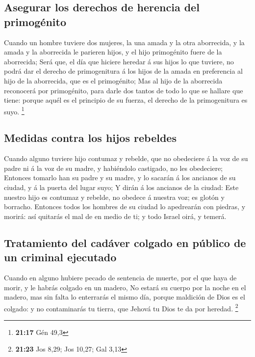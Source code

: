 \hypertarget{asegurar-los-derechos-de-herencia-del-primoguxe9nito}{%
\subsection{Asegurar los derechos de herencia del
primogénito}\label{asegurar-los-derechos-de-herencia-del-primoguxe9nito}}

 Cuando un hombre tuviere dos mujeres, la una amada y la
otra aborrecida, y la amada y la aborrecida le parieren hijos, y el hijo
primogénito fuere de la aborrecida;  Será que, el día que
hiciere heredar á sus hijos lo que tuviere, no podrá dar el derecho de
primogenitura á los hijos de la amada en preferencia al hijo de la
aborrecida, que es el primogénito;  Mas al hijo de la
aborrecida reconocerá por primogénito, para darle dos tantos de todo lo
que se hallare que tiene: porque aquél es el principio de su fuerza, el
derecho de la primogenitura es suyo. \footnote{\textbf{21:17} Gén 49,3}

\hypertarget{medidas-contra-los-hijos-rebeldes}{%
\subsection{Medidas contra los hijos
rebeldes}\label{medidas-contra-los-hijos-rebeldes}}

 Cuando alguno tuviere hijo contumaz y rebelde, que no
obedeciere á la voz de su padre ni á la voz de su madre, y habiéndolo
castigado, no les obedeciere;  Entonces tomarlo han su
padre y su madre, y lo sacarán á los ancianos de su ciudad, y á la
puerta del lugar suyo;  Y dirán á los ancianos de la
ciudad: Este nuestro hijo es contumaz y rebelde, no obedece á nuestra
voz; es glotón y borracho.  Entonces todos los hombres de
su ciudad lo apedrearán con piedras, y morirá: así quitarás el mal de en
medio de ti; y todo Israel oirá, y temerá.

\hypertarget{tratamiento-del-caduxe1ver-colgado-en-puxfablico-de-un-criminal-ejecutado}{%
\subsection{Tratamiento del cadáver colgado en público de un criminal
ejecutado}\label{tratamiento-del-caduxe1ver-colgado-en-puxfablico-de-un-criminal-ejecutado}}

 Cuando en alguno hubiere pecado de sentencia de muerte,
por el que haya de morir, y le habrás colgado en un madero,
 No estará su cuerpo por la noche en el madero, mas sin
falta lo enterrarás el mismo día, porque maldición de Dios es el
colgado: y no contaminarás tu tierra, que Jehová tu Dios te da por
heredad. \footnote{\textbf{21:23} Jos 8,29; Jos 10,27; Gal 3,13}

